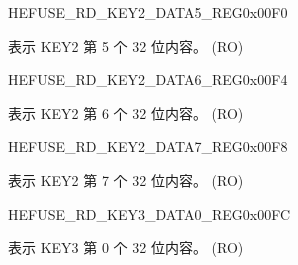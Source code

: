 \begin{register}{H}{EFUSE\_RD\_KEY2\_DATA5\_REG}{0x00F0}\label{regdesc:EFUSERDKEY2DATA5REG}
%
\regnewline%
\begin{regdesc}\begin{reglist}
\label{fielddesc:EFUSEKEY2DATA5}\item [EFUSE\_KEY2\_DATA5] 表示 KEY2 第 5 个 32 位内容。 (RO)
\end{reglist}\end{regdesc}
\end{register}


\begin{register}{H}{EFUSE\_RD\_KEY2\_DATA6\_REG}{0x00F4}\label{regdesc:EFUSERDKEY2DATA6REG}
%
\regnewline%
\begin{regdesc}\begin{reglist}
\label{fielddesc:EFUSEKEY2DATA6}\item [EFUSE\_KEY2\_DATA6] 表示 KEY2 第 6 个 32 位内容。 (RO)
\end{reglist}\end{regdesc}
\end{register}


\begin{register}{H}{EFUSE\_RD\_KEY2\_DATA7\_REG}{0x00F8}\label{regdesc:EFUSERDKEY2DATA7REG}
%
\regnewline%
\begin{regdesc}\begin{reglist}
\label{fielddesc:EFUSEKEY2DATA7}\item [EFUSE\_KEY2\_DATA7] 表示 KEY2 第 7 个 32 位内容。 (RO)
\end{reglist}\end{regdesc}
\end{register}


\begin{register}{H}{EFUSE\_RD\_KEY3\_DATA0\_REG}{0x00FC}\label{regdesc:EFUSERDKEY3DATA0REG}
%
\regnewline%
\begin{regdesc}\begin{reglist}
\label{fielddesc:EFUSEKEY3DATA0}\item [EFUSE\_KEY3\_DATA0] 表示 KEY3 第 0 个 32 位内容。 (RO)
\end{reglist}\end{regdesc}
\end{register}


